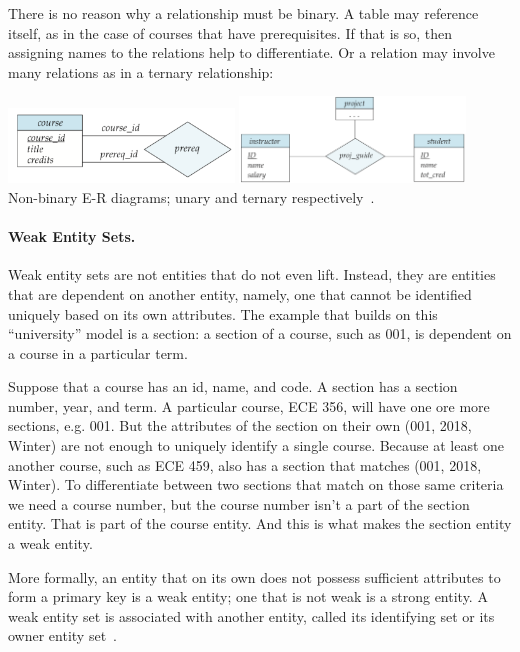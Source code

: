 There is no reason why a relationship must be binary. A table may reference itself, as in the case of courses that have prerequisites. If that is so, then assigning names to the relations help to differentiate. Or a relation may involve many relations as in a ternary relationship:

\begin{center}
\includegraphics[width=0.45\textwidth]{images/prereq}
\includegraphics[width=0.45\textwidth]{images/er-ternary}\\
Non-binary E-R diagrams; unary and ternary respectively~\cite{dsc}.
\end{center}

\paragraph{Weak Entity Sets.} Weak entity sets are not entities that do not even lift. Instead, they are entities that are dependent on another entity, namely, one that cannot be identified uniquely based on its own attributes. The example that builds on this ``university'' model is a section: a section of a course, such as 001, is dependent on a course in a particular term. 

Suppose that a course has an id, name, and code. A section has a section number, year, and term. A particular course, ECE 356, will have one ore more sections, e.g. 001. But the attributes of the section on their own (001, 2018, Winter) are not enough to uniquely identify a single course. Because at least one another course, such as ECE 459, also has a section that matches (001, 2018, Winter). To differentiate between two sections that match on those same criteria we need a course number, but the course number isn't a part of the section entity. That is part of the course entity. And this is what makes the section entity a weak entity.

More formally, an entity that on its own does not possess sufficient attributes to form a primary key is a weak entity; one that is not weak is a strong entity. A weak entity set is associated with another entity, called its identifying set or its owner entity set~\cite{dsc}.

